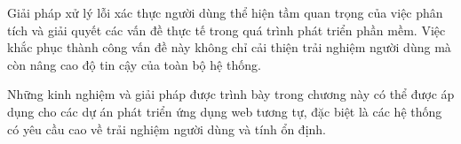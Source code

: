 Giải pháp xử lý lỗi xác thực người dùng thể hiện tầm quan trọng của việc phân tích và giải quyết các vấn đề thực tế trong quá trình phát triển phần mềm. Việc khắc phục thành công vấn đề này không chỉ cải thiện trải nghiệm người dùng mà còn nâng cao độ tin cậy của toàn bộ hệ thống.

Những kinh nghiệm và giải pháp được trình bày trong chương này có thể được áp dụng cho các dự án phát triển ứng dụng web tương tự, đặc biệt là các hệ thống có yêu cầu cao về trải nghiệm người dùng và tính ổn định.